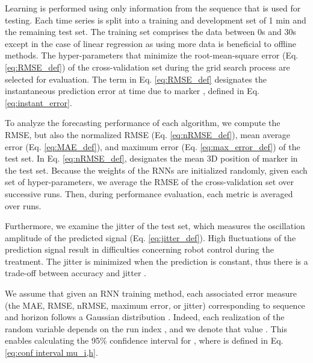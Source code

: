 \documentclass[twocolumn,a4paper]{svjour3} \sloppy          \smartqed
\begin{document}
Learning is performed using only information from the sequence that is used for testing. Each time series is split into a training and development set of 1 min and the remaining test set. The training set comprises the data between 0s and 30s except in the case of linear regression as using more data is beneficial to offline methods. The hyper-parameters that minimize the root-mean-square error (Eq. \ref{eq:RMSE_def}) of the cross-validation set during the grid search process are selected for evaluation. The term  in Eq. \ref{eq:RMSE_def} designates the instantaneous prediction error at time  due to marker , defined in Eq. \ref{eq:instant_error}.





To analyze the forecasting performance of each algorithm, we compute the RMSE, but also the normalized RMSE (Eq. \ref{eq:nRMSE_def}), mean average error (Eq. \ref{eq:MAE_def}), and maximum error (Eq. \ref{eq:max_error_def}) of the test set.  In Eq. \ref{eq:nRMSE_def},  designates the mean 3D position of marker  in the test set. Because the weights of the RNNs are initialized randomly, given each set of hyper-parameters, we average the RMSE of the cross-validation set over  successive runs. Then, during performance evaluation, each metric is averaged over  runs.



 



Furthermore, we examine the jitter of the test set, which measures the oscillation amplitude of the predicted signal (Eq. \ref{eq:jitter_def}). High fluctuations of the prediction signal result in difficulties concerning robot control during the treatment. The jitter  is minimized when the prediction is constant, thus there is a trade-off between accuracy and jitter \cite{krilavicius2016predicting}.

 

We assume that given an RNN training method, each associated error measure  (the MAE, RMSE, nRMSE, maximum error, or jitter) corresponding to sequence  and horizon  follows a Gaussian distribution . Indeed, each realization of the random variable  depends on the run index , and we denote that value . This enables calculating the 95\% confidence interval  for , where  is defined in Eq. \ref{eq:conf interval mu_i,h}. \footnotemark

\end{document}
